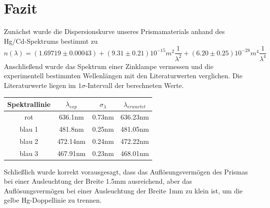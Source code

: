 \documentclass[12pt,a4paper]{article}
\begin{document}
\section{Fazit}
Zunächst wurde die Dispersionskurve unseres Prismamaterials anhand des Hg/Cd-Spektrums bestimmt zu
\begin{equation}
n(\lambda)=(1.69719\pm0.00043)+(9.31\pm0.21)10^{-15}m^2\frac{1}{\lambda^2}+(6.20\pm0.25)10^{-28}m^4\frac{1}{\lambda^4}
\end{equation}
Anschließend wurde das Spektrum einer Zinklampe vermessen und die experimentell bestimmten Wellenlängen mit den Literaturwerten verglichen. Die Literaturwerte liegen im $1\sigma$-Intervall der berechneten Werte.
\begin{center}
\begin{tabular}{|c|c|c|c|}
 	\hline
 	Spektrallinie & $\lambda_{exp}$&$\sigma_{\lambda}$&$\lambda_{erwartet}$\\
 	\hline
 	rot&636.1nm&0.73nm&636.23nm\\
 	blau 1&481.8nm&0.25nm&481.05nm\\
 	blau 2&472.14nm&0.24nm&472.22nm\\
 	blau 3&467.91nm&0.23nm&468.01nm\\
 	\hline
\end{tabular}
\end{center}Schließlich wurde korrekt vorausgesagt, dass das Auflösungsvermögen des Prismas bei einer Ausleuchtung der Breite 1.5mm ausreichend, aber das Auflösungsvermögen bei einer Ausleuchtung der Breite 1mm zu klein ist, um die gelbe Hg-Doppellinie zu trennen.
\end{document}

